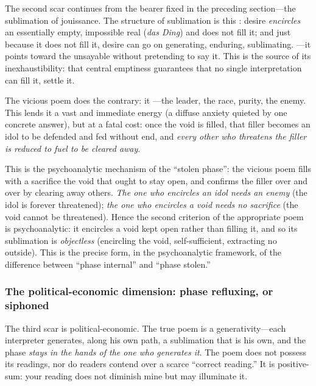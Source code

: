 The second scar continues from the bearer fixed in the preceding section---the sublimation of jouissance. The structure of sublimation is this \parencite{lacan1992}: desire \emph{encircles} an essentially empty, impossible real (\emph{das Ding}) and does not fill it; and just because it does not fill it, desire can go on generating, enduring, sublimating. ---it points toward the unsayable without pretending to say it. This is the source of its inexhaustibility: that central emptiness guarantees that no single interpretation can fill it, settle it.

The vicious poem does the contrary: it ---the leader, the race, purity, the enemy. This lends it a vast and immediate energy (a diffuse anxiety quieted by one concrete answer), but at a fatal cost: once the void is filled, that filler becomes an idol to be defended and fed without end, and \emph{every other who threatens the filler is reduced to fuel to be cleared away}.

\begin{claim}
This is the psychoanalytic mechanism of the ``stolen phase'': the vicious poem fills with a sacrifice the void that ought to stay open, and confirms the filler over and over by clearing away others. \emph{The one who encircles an idol needs an enemy} (the idol is forever threatened); \emph{the one who encircles a void needs no sacrifice} (the void cannot be threatened). Hence the second criterion of the appropriate poem is psychoanalytic: it encircles a void kept open rather than filling it, and so its sublimation is \emph{objectless} (encircling the void, self-sufficient, extracting no outside). This is the precise form, in the psychoanalytic framework, of the difference between ``phase internal'' and ``phase stolen.''
\end{claim}

\subsubsection{The political-economic dimension: phase refluxing, or siphoned}

The third scar is political-economic. The true poem is a  generativity---each interpreter generates, along his own path, a sublimation that is his own, and the phase \emph{stays in the hands of the one who generates it}. The poem does not possess its readings, nor do readers contend over a scarce ``correct reading.'' It is positive-sum: your reading does not diminish mine but may illuminate it.

